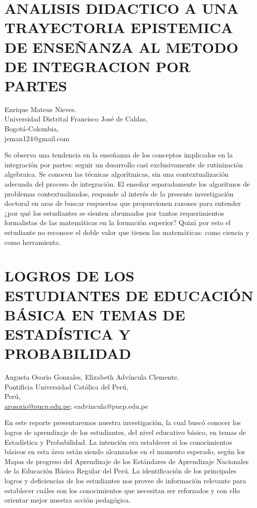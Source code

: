 \section{ANALISIS DIDACTICO A UNA TRAYECTORIA EPISTEMICA DE ENSEÑANZA AL METODO
DE INTEGRACION POR PARTES}

\begin{datos}
Enrique Mateus Nieves.\\
Universidad Distrital Francisco José de Caldas,\\
Bogotá-Colombia,\\
\hfill  jeman124@gmail.com
\end{datos}

Se observa una tendencia en la enseñanza de los conceptos implicados
en la integración por partes: seguir un desarrollo casi exclusivamente
de rutinización algebraica. Se conocen las técnicas algorítmicas,
sin una contextualización adecuada del proceso de integración. El
enseñar separadamente los algoritmos de problemas contextualizados,
responde al interés de la presente investigación doctoral en aras
de buscar respuestas que proporcionen razones para entender ¿por qué
los estudiantes se sienten abrumados por tantos requerimientos formalistas
de las matemáticas en la formación superior? Quizá por esto el estudiante
no reconoce el doble valor que tienen las matemáticas: como ciencia
y como herramienta.


\section{LOGROS DE LOS ESTUDIANTES DE EDUCACIÓN BÁSICA EN TEMAS DE ESTADÍSTICA
Y PROBABILIDAD }

\begin{datos}
Augusta Osorio Gonzales, Elizabeth Advíncula Clemente.\\
Pontificia Universidad Católica del Perú,\\
Perú,\\
\hfill  \url{arosorio@pucp.edu.pe}; eadvincula@pucp.edu.pe
\end{datos}

En este reporte presentaremos nuestra investigación, la cual buscó
conocer los logros de aprendizaje de los estudiantes, del nivel educativo
básico, en temas de Estadística y Probabilidad. La intención era establecer
si los conocimientos básicos en esta área están siendo alcanzados
en el momento esperado, según los Mapas de progreso del Aprendizaje
de los Estándares de Aprendizaje Nacionales de la Educación Básica
Regular del Perú. La identificación de los principales logros y deficiencias
de los estudiantes nos provee de información relevante para establecer
cuáles son los conocimientos que necesitan ser reforzados y con ello
orientar mejor nuestra acción pedagógica. 



